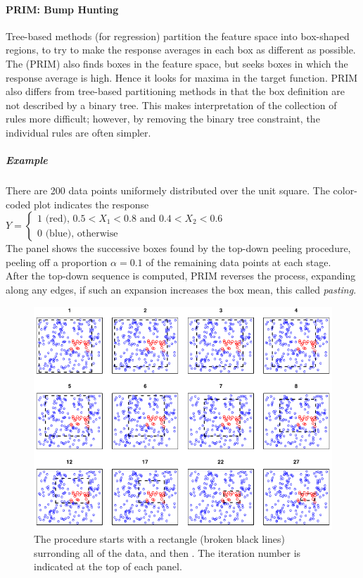 \paragraph{PRIM: Bump Hunting}
Tree-based methods (for regression) partition the feature space into box-shaped regions, to try to
make the response averages in each box as different as possible.\\
The  (PRIM) also finds boxes in the feature space, but seeks 
boxes in which the response average is high. Hence it looks for maxima in the target function.
PRIM also differs from tree-based partitioning methods in that the box definition are not 
described by a binary tree.
This makes interpretation of the collection of rules more difficult; however, by removing the binary
tree constraint, the individual rules are often simpler.
\subparagraph{Example}
There are 200 data points uniformely distributed over the unit square. The color-coded plot indicates
the response $Y=
\begin{cases}
	1\text{ (red), }0.5<X_{1}<0.8\text{ and }0.4<X_{2}<0.6\\
	0\text{ (blue), otherwise}
\end{cases}$\\
The panel shows the successive boxes found by the top-down peeling procedure, peeling off a 
proportion $\alpha=0.1$ of the remaining data points at each stage.\\
After the top-down sequence is computed, PRIM reverses the process, expanding along any edges, if 
such an expansion increases the box mean, this called \emph{pasting}.
\begin{figure}[H]
	\begin{center}
		\includegraphics[width=.7\textwidth]{./chap/1chap/7sec/images/6_prim.png}
	\end{center}
	\caption{The procedure starts with a rectangle (broken black lines) surronding all of the 
	data, and then . The iteration number is indicated at 
	the top of each panel.}
	\label{fig:6_prim}
\end{figure}
